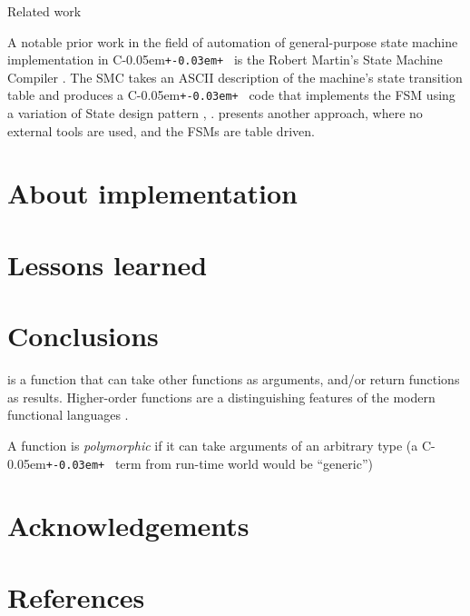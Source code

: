 \documentclass{kapproc}
\newcommand{\Cpp}{C\kern-0.05em\texttt{+\kern-0.03em+}%
}
\begin{document}
Related work

A notable prior work in the field of automation of general-purpose 
state machine implementation in \Cpp\ is the Robert Martin's State 
Machine Compiler \cite{SMC}. The SMC takes an ASCII description of the 
machine's state transition table and produces a \Cpp\ code that 
implements the FSM using a variation of State design pattern \cite{Hun91},
\cite{GHJ+95}. \cite{Laf00} presents another approach, where no external tools 
are used, and the FSMs are table driven. 


\section{About implementation}

\section{Lessons learned}

\section{Conclusions}

\begin{glossary}
   is a function that can take other
  functions as arguments, and/or return functions as
  results. Higher-order functions are a distinguishing features of the
  modern functional languages \cite{Hud79}.

   A function is \emph{polymorphic} if it can take
  arguments of an arbitrary type (a \Cpp\ term from run-time world
  would be ``generic'')
\end{glossary}


\section{Acknowledgements}
\section{References}
\end{document}
